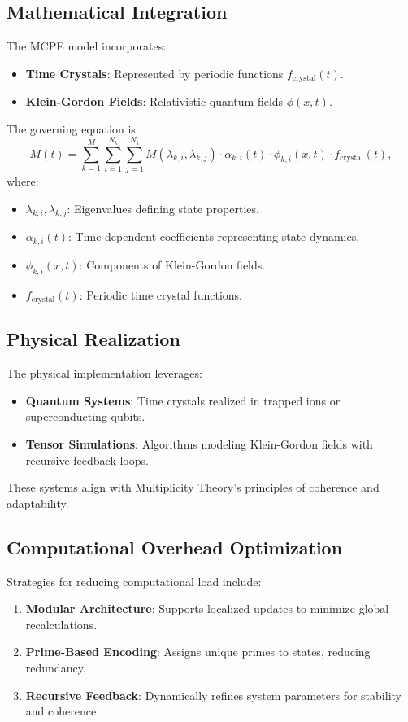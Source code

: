 \documentclass{article}
\theoremstyle{plain}
\begin{document}
\subsection{Mathematical Integration}
The MCPE model incorporates:
\begin{itemize}
    \item \textbf{Time Crystals}: Represented by periodic functions \( f_{\text{crystal}}(t) \).
    \item \textbf{Klein-Gordon Fields}: Relativistic quantum fields \( \phi(x, t) \).
\end{itemize}
The governing equation is:
\begin{equation}
M(t) = \sum_{k=1}^M \sum_{i=1}^{N_k} \sum_{j=1}^{N_k} M(\lambda_{k,i}, \lambda_{k,j}) \cdot \alpha_{k,i}(t) \cdot \phi_{k,i}(x,t) \cdot f_{\text{crystal}}(t),
\end{equation}
where:
\begin{itemize}
    \item \( \lambda_{k,i}, \lambda_{k,j} \): Eigenvalues defining state properties.
    \item \( \alpha_{k,i}(t) \): Time-dependent coefficients representing state dynamics.
    \item \( \phi_{k,i}(x,t) \): Components of Klein-Gordon fields.
    \item \( f_{\text{crystal}}(t) \): Periodic time crystal functions.
\end{itemize}

\subsection{Physical Realization}
The physical implementation leverages:
\begin{itemize}
    \item \textbf{Quantum Systems}: Time crystals realized in trapped ions or superconducting qubits.
    \item \textbf{Tensor Simulations}: Algorithms modeling Klein-Gordon fields with recursive feedback loops.
\end{itemize}
These systems align with Multiplicity Theory’s principles of coherence and adaptability.

\subsection{Computational Overhead Optimization}
Strategies for reducing computational load include:
\begin{enumerate}
    \item \textbf{Modular Architecture}: Supports localized updates to minimize global recalculations.
    \item \textbf{Prime-Based Encoding}: Assigns unique primes to states, reducing redundancy.
    \item \textbf{Recursive Feedback}: Dynamically refines system parameters for stability and coherence.
\end{enumerate}
\end{document}
